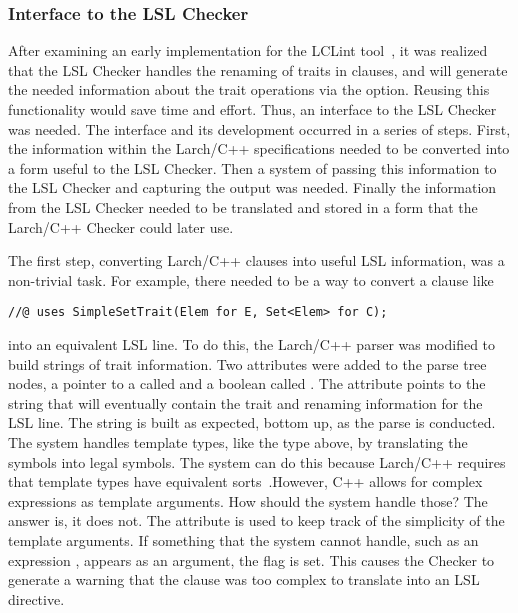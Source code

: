\subsubsection{Interface to the LSL Checker}
\label{lslinterf}
After examining an early implementation for the LCLint
tool~\cite{lclint}, it was realized that the LSL Checker handles the
renaming of traits in
 clauses, and will generate the needed information
about the trait operations via the  option. Reusing
this functionality would save time and effort. Thus, an interface to
the LSL Checker was needed. The interface and its development occurred
in a series of steps. First, the information within the Larch/C++
specifications needed to be converted into a form useful to the LSL
Checker. Then a system of passing this information to the LSL Checker
and capturing the output was needed. Finally the information from the
LSL Checker needed to be translated and stored in a form that the
Larch/C++ Checker could later use.

The first step, converting Larch/C++  clauses into useful LSL
information, was a non-trivial task. For example, there needed to be a
way to convert a  clause like 
\begin{verbatim}
//@ uses SimpleSetTrait(Elem for E, Set<Elem> for C);
\end{verbatim}
into an equivalent LSL  line. To do this, the
Larch/C++ parser was modified to build strings of trait
information. Two attributes were added to the parse tree nodes, a
pointer to a
 called  and a boolean called
. The  attribute points to the
string that will eventually contain the trait and renaming information
for the LSL  line. The string is built as expected,
bottom up, as the parse is conducted. The system handles template
types, like the type  above, by translating the
\reserved{<>} symbols into legal \reserved{[]} symbols. The system can
do this because Larch/C++ requires that template types have equivalent
sorts~\cite[Page 20]{Leavens96c}.However, C++ allows for complex
expressions as template arguments. How should the system handle those?
The answer is, it does not. The  attribute is
used to keep track of the simplicity of the template arguments. If
something that the system cannot handle, such as an expression
, appears as an argument, the 
flag is set. This causes the Checker to generate a warning that the
 clause was too complex to translate into an LSL
 directive.


